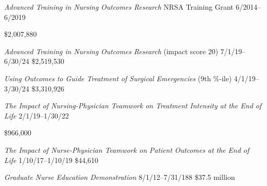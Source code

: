 \documentclass[10pt,]{article}
\begin{document}
{{{{{{{{{{{{\textit {Advanced Training in Nursing Outcomes Research} NRSA Training Grant \hfill 6/2014--6/2019 \newline
{	\hfill \$2,007,880

\vspace{4mm}


\textit {Advanced Training in Nursing Outcomes Research} (impact score 20) \hfill  7/1/19--6/30/24 \newline
{} \hfill \$2,519,530

\textit {Using Outcomes to Guide Treatment of Surgical Emergencies} (9{\small{th}} {\small{\%-ile}}) \hfill 4/1/19--3/30/24 \newline
{}	\hfill \$3,310,926

\textit {The Impact of Nursing-Physician Teamwork on Treatment Intensity at the End of Life} \hfill 2/1/19--1/30/22 \newline
{	\hfill \$966,000

\vspace{4mm}


\textit {The Impact of Nurse-Physician Teamwork on Patient Outcomes at the End of Life} \hfill 1/10/17--1/10/19 \newline
{}	\hfill \$44,610

\textit {Graduate Nurse Education Demonstration} \hfill 8/1/12--7/31/188 \newline
{}	\hfill \$37.5 million

}}}}}}}}}}}}}}
\end{document}

